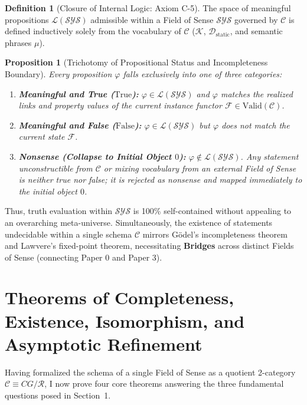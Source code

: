 \documentclass[11pt,a4paper]{article}
\theoremstyle{definition}
\newtheorem{definition}{Definition}[section]
\theoremstyle{plain}
\newtheorem{proposition}{Proposition}[section]
\theoremstyle{remark}
\newcommand{\Valid}{\mathrm{Valid}}
\newcommand{\Dstatic}{\mathcal{D}_{\mathrm{static}}}
\begin{document}
\begin{definition}[Closure of Internal Logic: Axiom C-5]\label{def:logic-closure}
The space of meaningful propositions $\mathcal{L}(\mathcal{SYS})$ admissible within a Field of Sense $\mathcal{SYS}$ governed by $\mathcal{C}$ is defined inductively solely from the vocabulary of $\mathcal{C}$ ($\mathcal{K}$, $\Dstatic$, and semantic phrases $\mu$).
\end{definition}

\begin{proposition}[Trichotomy of Propositional Status and Incompleteness Boundary]\label{prop:trichotomy}
Every proposition $\varphi$ falls exclusively into one of three categories:
\begin{enumerate}
    \item \textbf{Meaningful and True ($\mathrm{True}$):} $\varphi \in \mathcal{L}(\mathcal{SYS})$ and $\varphi$ matches the realized links and property values of the current instance functor $\mathcal{F} \in \Valid(\mathcal{C})$.
    \item \textbf{Meaningful and False ($\mathrm{False}$):} $\varphi \in \mathcal{L}(\mathcal{SYS})$ but $\varphi$ does not match the current state $\mathcal{F}$.
    \item \textbf{Nonsense (Collapse to Initial Object $0$):} $\varphi \notin \mathcal{L}(\mathcal{SYS})$. Any statement unconstructible from $\mathcal{C}$ or mixing vocabulary from an external Field of Sense is neither true nor false; it is rejected as \emph{nonsense} and mapped immediately to the initial object $0$.
\end{enumerate}
\end{proposition}

Thus, truth evaluation within $\mathcal{SYS}$ is 100\% self-contained without appealing to an overarching meta-universe. Simultaneously, the existence of statements undecidable within a single schema $\mathcal{C}$ mirrors G\"odel's incompleteness theorem and Lawvere's fixed-point theorem, necessitating \textbf{Bridges} across distinct Fields of Sense (connecting Paper 0 and Paper 3).

\section{Theorems of Completeness, Existence, Isomorphism, and Asymptotic Refinement}

Having formalized the schema of a single Field of Sense as a quotient 2-category $\mathcal{C} \equiv CG/\mathcal{R}$, I now prove four core theorems answering the three fundamental questions posed in Section~1.
\end{document}
